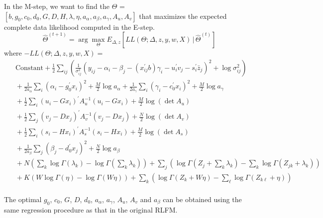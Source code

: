 In the M-step, we want to find the $\Theta$ = $[b, g_0, c_0, d_0, G, D, H, \lambda, \eta, a_\alpha, a_\beta, a_\gamma, A_u, A_v]$ that maximizes the expected complete data likelihood computed in the E-step.
$$
\hat{\Theta}^{(t+1)}= \arg\max_{\Theta}
 E_{\Delta, z}[LL(\Theta; \Delta, z, y, w, X) \,|\, \hat{\Theta}^{(t)}]
$$
where $- LL(\Theta; \Delta, z, y, w, X) =$
{\small\begin{equation*}
\begin{split}
& ~~   \mbox{Constant} +
			\frac{1}{2} \sum_{ij} \left( \frac{1}{\sigma_{ij}^{2}}
			(y_{ij}-\alpha_i-\beta_j- (x_{ij}^{\prime}b) \gamma_i
				- u_i^\prime v_j - s_{i}^{\prime} \bar{z}_{j})^{2}
			+ \log \sigma_{ij}^{2} \right) \\
& ~~ + \frac{1}{2 a_{\alpha}} \sum_{i}
				(\alpha_i - g_{0}^{\prime}x_i)^{2}
				+ \frac{M}{2} \log a_{\alpha}
		+ \frac{1}{2 a_{\gamma}} \sum_{i} 
				(\gamma_i - c_{0}^{\prime}x_i)^{2}
				+ \frac{M}{2} \log a_{\gamma}  \\
& ~~	+ \frac{1}{2} \sum_{i} 
				(u_i - Gx_i)^{\prime} A_u^{-1} (u_i - Gx_i)
				+ \frac{M}{2} \log(\det A_u) \\
& ~~	+ \frac{1}{2} \sum_{j} 
				(v_j - Dx_j)^{\prime} A_v^{-1} (v_j - Dx_j)
				+ \frac{N}{2} \log(\det A_v) \\
& ~~	+ \frac{1}{2} \sum_{i} 
				(s_i - Hx_i)^{\prime} A_s^{-1} (s_i - Hx_i)
				+ \frac{M}{2} \log(\det A_s) \\
& ~~ 	+ \frac{1}{2 a_{\beta}} \sum_{j}  
				 (\beta_j - d_{0}^{\prime}x_j)^{2}
				+ \frac{N}{2} \log a_{\beta}  \\
& ~~ 	+ N \left( \sum_k \log\Gamma(\lambda_k) 
				- \log\Gamma(\textstyle\sum_k \lambda_k) \right)
				+ \sum_j \left(
						\log\Gamma\left(Z_j + \textstyle\sum_k \lambda_k\right) -
						\sum_k \log\Gamma(Z_{jk} + \lambda_k)
				  \right) \\
& ~~ 	+ K \left( W \log\Gamma(\eta) 
				- \log\Gamma(W \eta) \right)
				+ \sum_k \left(
						\log\Gamma(Z_k + W \eta) -
						\sum_\ell \log\Gamma(Z_{k\ell} + \eta)
				  \right) \\
\end{split}
\end{equation*}}

\noindent The optimal $g_0$, $c_0$, $G$, $D$, $d_0$, $a_\alpha$, $a_\gamma$, $A_u$, $A_v$ and $a_\beta$ can be obtained using the same regression procedure as that in the original RLFM.
\\

